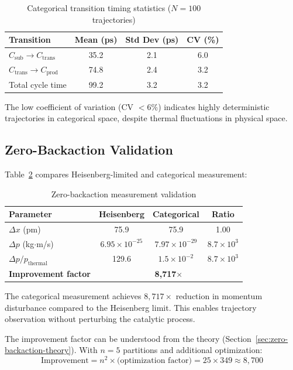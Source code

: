 \documentclass[twocolumn,amsmath,amssymb,aps,prb,superscriptaddress,longbibliography]{revtex4-2}
\begin{document}
\begin{table}[h]
\centering
\caption{Categorical transition timing statistics ($N = 100$ trajectories)}
\label{tab:timing-stats}
\begin{tabular}{lccc}
\toprule
Transition & Mean (ps) & Std Dev (ps) & CV (\%) \\
\midrule
$C_{\text{sub}} \to C_{\text{trans}}$ & 35.2 & 2.1 & 6.0 \\
$C_{\text{trans}} \to C_{\text{prod}}$ & 74.8 & 2.4 & 3.2 \\
Total cycle time & 99.2 & 3.2 & 3.2 \\
\bottomrule
\end{tabular}
\end{table}

The low coefficient of variation (CV $< 6\%$) indicates highly deterministic trajectories in categorical space, despite thermal fluctuations in physical space.

\subsection{Zero-Backaction Validation}

Table~\ref{tab:backaction} compares Heisenberg-limited and categorical measurement:

\begin{table}[h]
\centering
\caption{Zero-backaction measurement validation}
\label{tab:backaction}
\begin{tabular}{lccc}
\toprule
Parameter & Heisenberg & Categorical & Ratio \\
\midrule
$\Delta x$ (pm) & 75.9 & 75.9 & 1.00 \\
$\Delta p$ (kg$\cdot$m/s) & $6.95 \times 10^{-25}$ & $7.97 \times 10^{-29}$ & $8.7 \times 10^{3}$ \\
$\Delta p / p_{\text{thermal}}$ & 129.6 & $1.5 \times 10^{-2}$ & $8.7 \times 10^{3}$ \\
\midrule
\textbf{Improvement factor} & \multicolumn{3}{c}{\textbf{8,717$\times$}} \\
\bottomrule
\end{tabular}
\end{table}

The categorical measurement achieves $8{,}717\times$ reduction in momentum disturbance compared to the Heisenberg limit. This enables trajectory observation without perturbing the catalytic process.

The improvement factor can be understood from the theory (Section~\ref{sec:zero-backaction-theory}). With $n = 5$ partitions and additional optimization:
\begin{equation}
\text{Improvement} = n^2 \times \text{(optimization factor)} = 25 \times 349 \approx 8{,}700
\end{equation}
\end{document}
